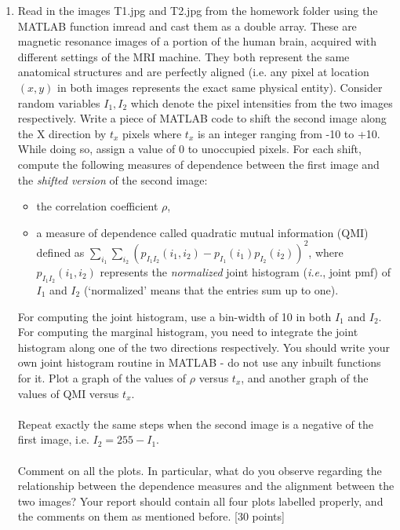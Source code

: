 \documentclass[11pt]{article}
\begin{document}
\begin{enumerate}
\item Read in the images T1.jpg and T2.jpg from the homework folder using the MATLAB function imread and cast them as a double array. These are magnetic resonance images of a portion of the human brain, acquired with different settings of the MRI machine. They both represent the same anatomical structures and are perfectly aligned (i.e. any pixel at location $(x,y)$ in both images represents the exact same physical entity). Consider random variables $I_1, I_2$ which denote the pixel intensities from the two images respectively. Write a piece of MATLAB code to shift the second image along the X direction by $t_x$ pixels where $t_x$ is an integer ranging from -10 to +10. While doing so, assign a value of 0 to unoccupied pixels. For each shift, compute the following measures of dependence between the first image and the \emph{shifted version} of the second image:
\begin{itemize}
\item the correlation coefficient $\rho$, 
\item a measure of dependence called quadratic mutual information (QMI) defined as $\sum_{i_1}\sum_{i_2} (p_{I_1 I_2}(i_1,i_2)-p_{I_1}(i_1)p_{I_2}(i_2))^2$, where $p_{I_1 I_2}(i_1,i_2)$ represents the \emph{normalized} joint histogram (\textit{i.e.}, joint pmf) of $I_1$ and $I_2$ (`normalized' means that the entries sum up to one). 
\end{itemize}
For computing the joint histogram, use a bin-width of 10 in both $I_1$ and $I_2$. For computing the marginal histogram, you need to integrate the joint histogram along one of the two directions respectively. You should write your own joint histogram routine in MATLAB - do not use any inbuilt functions for it. Plot a graph of the values of $\rho$ versus $t_x$, and another graph of the values of QMI versus $t_x$.\\\\ Repeat exactly the same steps when the second image is a negative of the first image, i.e. $I_2 = 255 - I_1$. \\\\
Comment on all the plots. In particular, what do you observe regarding the relationship between the dependence measures and the alignment between the two images? Your report should contain all four plots labelled properly, and the comments on them as mentioned before. \textsf{[30 points]}

\end{enumerate}
\end{document}

